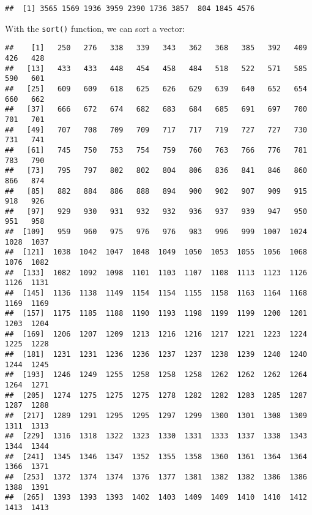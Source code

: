 \documentclass[
]{article}
\newenvironment{Shaded}{\begin{snugshade}}{\end{snugshade}}
\newcommand{\FunctionTok}[1]{\textcolor[rgb]{0.00,0.00,0.00}{#1}}
\newcommand{\NormalTok}[1]{#1}
\newcommand{\SpecialCharTok}[1]{\textcolor[rgb]{0.00,0.00,0.00}{#1}}
\begin{document}
\begin{verbatim}
##  [1] 3565 1569 1936 3959 2390 1736 3857  804 1845 4576
\end{verbatim}

With the \texttt{sort()} function, we can sort a vector:

\begin{Shaded}
\end{Shaded}

\begin{verbatim}
##    [1]   250   276   338   339   343   362   368   385   392   409   426   428
##   [13]   433   433   448   454   458   484   518   522   571   585   590   601
##   [25]   609   609   618   625   626   629   639   640   652   654   660   662
##   [37]   666   672   674   682   683   684   685   691   697   700   701   701
##   [49]   707   708   709   709   717   717   719   727   727   730   731   741
##   [61]   745   750   753   754   759   760   763   766   776   781   783   790
##   [73]   795   797   802   802   804   806   836   841   846   860   866   874
##   [85]   882   884   886   888   894   900   902   907   909   915   918   926
##   [97]   929   930   931   932   932   936   937   939   947   950   951   958
##  [109]   959   960   975   976   976   983   996   999  1007  1024  1028  1037
##  [121]  1038  1042  1047  1048  1049  1050  1053  1055  1056  1068  1076  1082
##  [133]  1082  1092  1098  1101  1103  1107  1108  1113  1123  1126  1126  1131
##  [145]  1136  1138  1149  1154  1154  1155  1158  1163  1164  1168  1169  1169
##  [157]  1175  1185  1188  1190  1193  1198  1199  1199  1200  1201  1203  1204
##  [169]  1206  1207  1209  1213  1216  1216  1217  1221  1223  1224  1225  1228
##  [181]  1231  1231  1236  1236  1237  1237  1238  1239  1240  1240  1244  1245
##  [193]  1246  1249  1255  1258  1258  1258  1262  1262  1262  1264  1264  1271
##  [205]  1274  1275  1275  1275  1278  1282  1282  1283  1285  1287  1287  1288
##  [217]  1289  1291  1295  1295  1297  1299  1300  1301  1308  1309  1311  1313
##  [229]  1316  1318  1322  1323  1330  1331  1333  1337  1338  1343  1344  1344
##  [241]  1345  1346  1347  1352  1355  1358  1360  1361  1364  1364  1366  1371
##  [253]  1372  1374  1374  1376  1377  1381  1382  1382  1386  1386  1388  1391
##  [265]  1393  1393  1393  1402  1403  1409  1409  1410  1410  1412  1413  1413

\end{verbatim}
\end{document}
